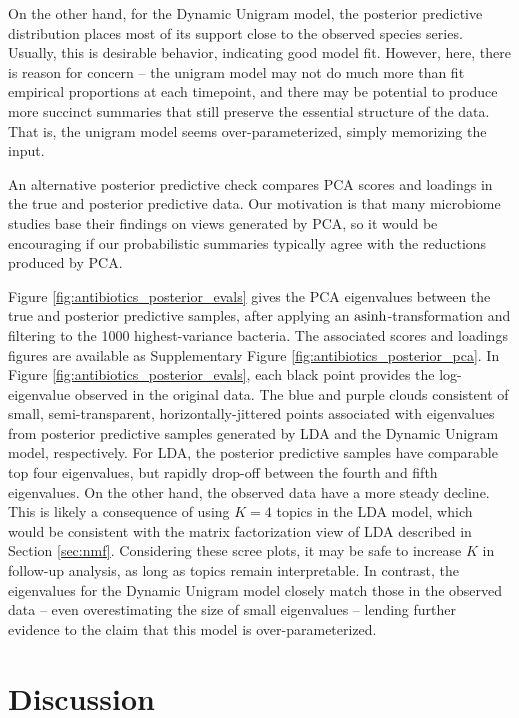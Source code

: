 \documentclass[oupdraft]{bio}
\begin{document}
{On the other hand, for the Dynamic Unigram model, the posterior predictive
distribution places most of its support close to the observed species series.
Usually, this is desirable behavior, indicating good model fit. However, here,
there is reason for concern -- the unigram model may not do much more than fit
empirical proportions at each timepoint, and there may be potential to produce
more succinct summaries that still preserve the essential structure of the data.
That is, the unigram model seems over-parameterized, simply memorizing the
input.

An alternative posterior predictive check compares PCA scores and loadings in
the true and posterior predictive data. Our motivation is that many microbiome
studies base their findings on views generated by PCA, so it would be encouraging
if our probabilistic summaries typically agree with the reductions produced by
PCA.

Figure \ref{fig:antibiotics_posterior_evals} gives the PCA eigenvalues between
the true and posterior predictive samples, after applying an
$\mathop\mathrm{asinh}$-transformation and filtering to the 1000 highest-variance bacteria. The
associated scores and loadings figures are available as Supplementary Figure
\ref{fig:antibiotics_posterior_pca}. In Figure
\ref{fig:antibiotics_posterior_evals}, each black point provides the
log-eigenvalue observed in the original data. The blue and purple clouds
consistent of small, semi-transparent, horizontally-jittered points associated
with eigenvalues from posterior predictive samples generated by LDA and the
Dynamic Unigram model, respectively. For LDA, the posterior predictive samples
have comparable top four eigenvalues, but rapidly drop-off between the fourth
and fifth eigenvalues. On the other hand, the observed data have a more steady
decline. This is likely a consequence of using $K = 4$ topics in the LDA model,
which would be consistent with the matrix factorization view of LDA described in
Section \ref{sec:nmf}. Considering these scree plots, it may be safe to increase
$K$ in follow-up analysis, as long as topics remain interpretable. In contrast,
the eigenvalues for the Dynamic Unigram model closely match those in the
observed data -- even overestimating the size of small eigenvalues -- lending
further evidence to the claim that this model is over-parameterized.

\section{Discussion}

}
\end{document}

